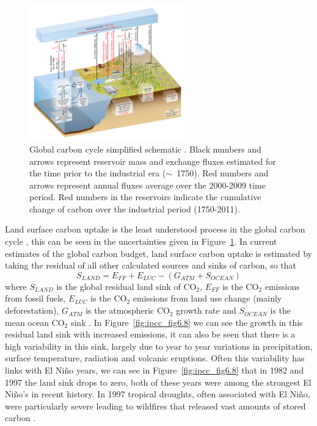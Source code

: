 \documentclass[11pt]{article}
\begin{document}
\begin{figure}[ht]
    \centering
    \includegraphics[width=0.6\textwidth]{ipcc_fig6_1.jpg}
    \caption{Global carbon cycle simplified schematic \citep{ciais2014carbon}. Black numbers and arrows represent reservoir mass and exchange fluxes estimated for the time prior to the industrial era (\(\sim\)~1750). Red numbers and arrows represent annual fluxes average over the 2000-2009 time period. Red numbers in the reservoirs indicate the cumulative change of carbon over the industrial period (1750-2011).}
    \label{fig:ipcc_fig6.1}
\end{figure}

Land surface carbon uptake is the least understood process in the global carbon cycle \citep{ciais2014carbon}, this can be seen in the uncertainties given in Figure~\ref{fig:ipcc_fig6.1}. In current estimates of the global carbon budget, land surface carbon uptake is estimated by taking the residual of all other calculated sources and sinks of carbon, so that
\begin{equation}
S_{LAND} = E_{FF} + E_{LUC} - (G_{ATM} + S_{OCEAN})
\end{equation}  
where \(S_{LAND}\) is the global residual land sink of CO\(_{2}\), \(E_{FF}\) is the CO\(_{2}\) emissions from fossil fuels, \(E_{LUC}\) is the CO\(_{2}\) emissions from land use change (mainly deforestation), \(G_{ATM}\) is the atmospheric CO\(_{2}\) growth rate and \(S_{OCEAN}\) is the mean ocean CO\(_{2}\) sink \citep{le2015global}. In Figure~\ref{fig:ipcc_fig6.8} we can see the growth in this residual land sink with increased emissions, it can also be seen that there is a high variability in this sink, largely due to year to year variations in precipitation, surface temperature, radiation and volcanic eruptions. Often this variability has links with El Ni\~no years, we can see in Figure~\ref{fig:ipcc_fig6.8} that in 1982 and 1997 the land sink drops to zero, both of these years were among the strongest El Ni\~no's in recent history. In 1997 tropical droughts, often associated with El Ni\~no, were particularly severe leading to wildfires that released vast amounts of stored carbon \citep{schimel2013climate}.
\end{document}

